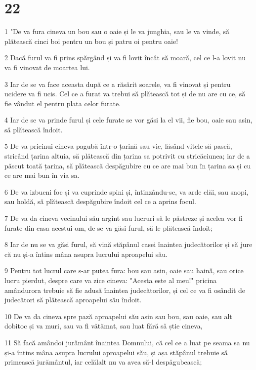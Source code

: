 \chapter{22}

\par 1 "De va fura cineva un bou sau o oaie și le va junghia, sau le va vinde, să plătească cinci boi pentru un bou și patru oi pentru oaie!
\par 2 Dacă furul va fi prins spărgând și va fi lovit încât să moară, cel ce l-a lovit nu va fi vinovat de moartea lui.
\par 3 Iar de se va face aceasta după ce a răsărit soarele, va fi vinovat și pentru ucidere va fi ucis. Cel ce a furat va trebui să plătească tot și de nu are cu ce, să fie vândut el pentru plata celor furate.
\par 4 Iar de se va prinde furul și cele furate se vor găsi la el vii, fie bou, oaie sau asin, să plătească îndoit.
\par 5 De va pricinui cineva pagubă într-o țarină sau vie, lăsând vitele să pască, stricând țarina altuia, să plătească din țarina sa potrivit cu stricăciunea; iar de a păscut toată țarina, să plătească despăgubire cu ce are mai bun în țarina sa și cu ce are mai bun în via sa.
\par 6 De va izbucni foc și va cuprinde spini și, întinzându-se, va arde clăi, sau snopi, sau holdă, să plătească despăgubire îndoit cel ce a aprins focul.
\par 7 De va da cineva vecinului său argint sau lucruri să le păstreze și acelea vor fi furate din casa acestui om, de se va găsi furul, să le plătească îndoit;
\par 8 Iar de nu se va găsi furul, să vină stăpânul casei înaintea judecătorilor și să jure că nu și-a întins mâna asupra lucrului aproapelui său.
\par 9 Pentru tot lucrul care s-ar putea fura: bou sau asin, oaie sau haină, sau orice lucru pierdut, despre care va zice cineva: "Acesta este al meu!" pricina amândurora trebuie să fie adusă înaintea judecătorilor, și cel ce va fi osândit de judecători să plătească aproapelui său îndoit.
\par 10 De va da cineva spre pază aproapelui său asin sau bou, sau oaie, sau alt dobitoc și va muri, sau va fi vătămat, sau luat fără să știe cineva,
\par 11 Să facă amândoi jurământ înaintea Domnului, că cel ce a luat pe seama sa nu și-a întins mâna asupra lucrului aproapelui său, și așa stăpânul trebuie să primească jurământul, iar celălalt nu va avea să-l despăgubească;
